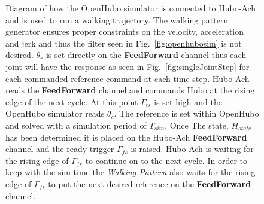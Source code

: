 \begin{figure}
\caption{Diagram of how the OpenHubo simulator is connected to Hubo-Ach and is used to run a walking trajectory.  
The walking pattern generator ensures proper constraints on the velocity, acceleration and jerk and thus the filter seen in Fig.~\ref{fig:openhubosim} is not desired.  
$\theta_r$ is set directly on the \textbf{FeedForward} channel thus each joint will have the response as seen in Fig.~\ref{fig:singleJointStep} for each commanded reference command at each time step.
Hubo-Ach reads the \textbf{FeedForward} channel and commands Hubo at the rising edge of the next cycle.  
At this point $\Gamma_{ts}$ is set high and the OpenHubo simulator reads $\theta_c$.  
The reference is set within OpenHubo and solved with a simulation period of $T_{sim}$.  
Once The state, $H_{state}$ has been determined it is placed on the Hubo-Ach \textbf{FeedForward} channel and the ready trigger $\Gamma_{fs}$ is raised.  
Hubo-Ach is waiting for the rising edge of $\Gamma_{fs}$ to continue on to the next cycle.  
In order to keep with the sim-time the \textit{Walking Pattern} also waits for the rising edge of $\Gamma_{fs}$ to put the next desired reference on the \textbf{FeedForward} channel. }
\label{fig:openhubosimWalking}
\end{figure}

